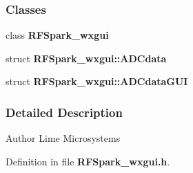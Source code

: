 \subsubsection*{Classes}
\begin{DoxyCompactItemize}
\item 
class {\bf R\+F\+Spark\+\_\+wxgui}
\item 
struct {\bf R\+F\+Spark\+\_\+wxgui\+::\+A\+D\+Cdata}
\item 
struct {\bf R\+F\+Spark\+\_\+wxgui\+::\+A\+D\+Cdata\+G\+UI}
\end{DoxyCompactItemize}


\subsubsection{Detailed Description}
\begin{DoxyAuthor}{Author}
Lime Microsystems 
\end{DoxyAuthor}


Definition in file {\bf R\+F\+Spark\+\_\+wxgui.\+h}.

